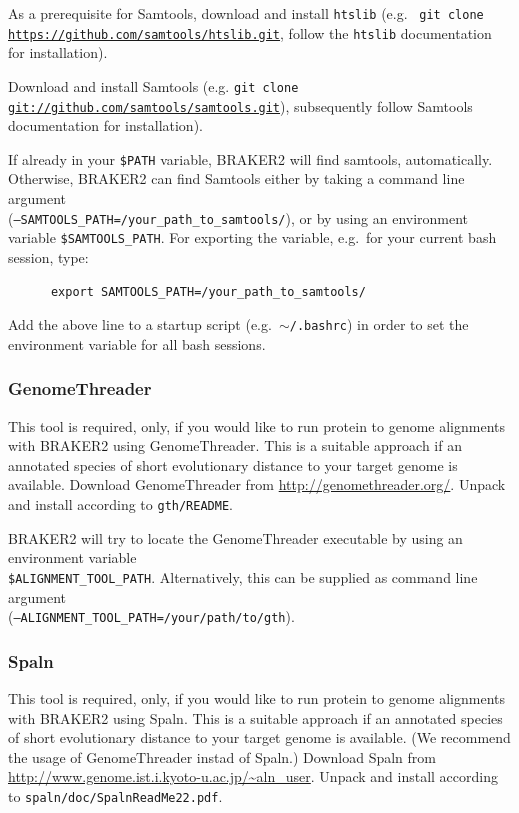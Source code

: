 \documentclass[a4paper,10pt]{report}
\begin{document}
      As a prerequisite for Samtools, download and install \texttt{htslib} (e.g.~ 
      \texttt{git clone \url{https://github.com/samtools/htslib.git}}, follow the \texttt{htslib} documentation for 
      installation).

      Download and install Samtools (e.g. \texttt{git clone \url{git://github.com/samtools/samtools.git}}), 
      subsequently follow Samtools documentation for installation).    

      If already in your \texttt{\$PATH} variable, BRAKER2 will find samtools, automatically. Otherwise, BRAKER2 can find Samtools either by taking a command line argument\\ (\texttt{--SAMTOOLS\_PATH=/your\_path\_to\_samtools/}), or by using an environment variable \texttt{\$SAMTOOLS\_PATH}. For exporting the variable, e.g.~for your current bash session, type:

    \begin{verbatim}
      export SAMTOOLS_PATH=/your_path_to_samtools/
    \end{verbatim}
    
        Add the above line to a startup script (e.g.~\texttt{$\sim$/.bashrc}) in order to set the environment variable for all bash sessions.
\subsubsection{GenomeThreader}

This tool is required, only, if you would like to run protein to genome alignments with BRAKER2 using GenomeThreader. This is a suitable approach if an annotated species of short evolutionary distance to your target genome is available. Download GenomeThreader from \url{http://genomethreader.org/}. Unpack and install according to \texttt{gth/README}.

BRAKER2 will try to locate the GenomeThreader executable by using an environment variable\\\texttt{\$ALIGNMENT\_TOOL\_PATH}. Alternatively, this can be supplied as command line argument \\(\texttt{--ALIGNMENT\_TOOL\_PATH=/your/path/to/gth}).

\subsubsection{Spaln}

This tool is required, only, if you would like to run protein to genome alignments with BRAKER2 using Spaln. This is a suitable approach if an annotated species of short evolutionary distance to your target genome is available. (We recommend the usage of GenomeThreader instad of Spaln.) Download Spaln from \url{http://www.genome.ist.i.kyoto-u.ac.jp/~aln_user}. Unpack and install according to \texttt{spaln/doc/SpalnReadMe22.pdf}.
\end{document}
